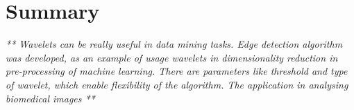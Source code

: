 \chapter{Summary}

\textit{** Wavelets can be really useful in data mining tasks. Edge detection algorithm was developed, as an example of usage wavelets in dimensionality reduction in pre-processing of machine learning. There are parameters like threshold and type of wavelet, which enable flexibility of the algorithm. The application in analysing biomedical images **}